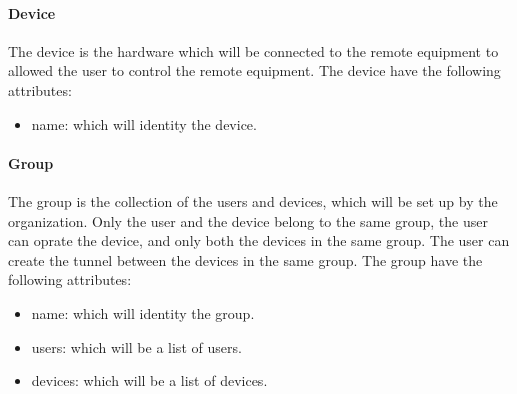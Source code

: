 \paragraph{Device}
The device is the hardware which will be connected to the remote equipment to allowed the user to control the remote equipment.
The device have the following attributes:
\begin{itemize}
    \item name: which will identity the device.
\end{itemize}
    
\paragraph{Group}
The group is the collection of the users and devices, which will be set up by the organization. 
Only the user and the device belong to the same group, the user can oprate the device, and only both the devices in the same group.
The user can create the tunnel between the devices in the same group.
The group have the following attributes:
\begin{itemize}
    \item name: which will identity the group.
    \item users: which will be a list of users.
    \item devices: which will be a list of devices.
\end{itemize}